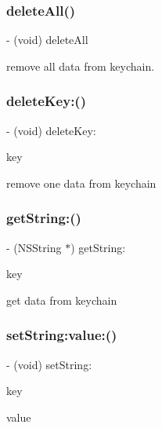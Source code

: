 \subsubsection{\texorpdfstring{delete\+All()}{deleteAll()}}
{\footnotesize\ttfamily -\/ (void) delete\+All \begin{DoxyParamCaption}{ }\end{DoxyParamCaption}}

remove all data from keychain. \mbox{\label{interface_uni_key_module_aa09e63616e9bf53c82d9ab230fe111b4}} 
\subsubsection{\texorpdfstring{delete\+Key\+:()}{deleteKey:()}}
{\footnotesize\ttfamily -\/ (void) delete\+Key\+: \begin{DoxyParamCaption}\item[{(N\+S\+String$\ast$)}]{key }\end{DoxyParamCaption}}

remove one data from keychain \mbox{\label{interface_uni_key_module_ad14f35dbf0453ec2807028edc3bc5c7f}} 
\subsubsection{\texorpdfstring{get\+String\+:()}{getString:()}}
{\footnotesize\ttfamily -\/ (N\+S\+String $\ast$) get\+String\+: \begin{DoxyParamCaption}\item[{(N\+S\+String $\ast$)}]{key }\end{DoxyParamCaption}}

get data from keychain \mbox{\label{interface_uni_key_module_a7240067e8b706485080753c8a8a063c1}} 
\subsubsection{\texorpdfstring{set\+String\+:value\+:()}{setString:value:()}}
{\footnotesize\ttfamily -\/ (void) set\+String\+: \begin{DoxyParamCaption}\item[{(N\+S\+String $\ast$)}]{key }\item[{value:(N\+S\+String $\ast$)}]{value }\end{DoxyParamCaption}}

